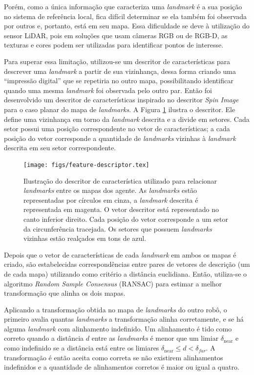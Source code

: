 Porém, como a única informação que caracteriza uma \textit{landmark} é a 
sua posição no sistema de referência local, fica difícil determinar se 
ela também foi observada por outros e, portanto, está em seu mapa. Essa 
dificuldade se deve à utilização do sensor LiDAR, pois em soluções que usam 
câmeras RGB ou de RGB-D, as texturas e cores podem ser utilizadas para 
identificar pontos de interesse.

Para superar essa limitação, utilizou-se um descritor de características 
para descrever uma \textit{landmark} a partir de sua vizinhança, dessa 
forma criando uma ``impressão digital'' que se repetiria no outro mapa, 
possibilitando identificar quando uma mesma \textit{landmark} foi observada 
pelo outro par. Então foi desenvolvido um descritor de características 
inspirado no descritor \textit{Spin Image} \cite{johnson1999using} 
para o caso planar do mapa de \textit{landmarks}. A Figura \ref{fig:feature-descriptor} ilustra o descritor. Ele define uma 
vizinhança em torno da \textit{landmark} descrita e a divide em setores. 
Cada setor possui uma posição correspondente no vetor de características; 
a cada posição do vetor corresponde a quantidade de \textit{landmarks} 
vizinhas à \textit{landmark} descrita em seu setor correspondente.

\begin{figure}[h]
  \centering
  \texttt{[image: figs/feature-descriptor.tex]}
  \caption[Descritor de características utilizado no registro de nuvem de pontos]{Ilustração do descritor de característica utilizado para 
  relacionar \textit{landmarks} entre os mapas dos agente. As \textit{landmarks} estão representadas por círculos em cinza, a \textit{landmark} descrita é representada em magenta. O vetor descritor está representado no canto inferior direito. Cada posição do vetor corresponde a um setor da circunferência tracejada. Os setores que 
  possuem \textit{landmarks} vizinhas estão realçados em tons de azul.}
  \label{fig:feature-descriptor}
\end{figure}

Depois que o vetor de características de cada \textit{landmark} em ambos os 
mapas é criado, são estabelecidas correspondências entre pares de vetores de descrição (um de cada mapa) utilizando 
como critério a distância euclidiana. 
Então, utiliza-se o algoritmo \textit{Random Sample Consensus} (RANSAC) 
\cite{fischler1981random} para estimar a melhor transformação que alinha 
os dois mapas.

Aplicando a transformação obtida no mapa de \textit{landmarks} do outro 
robô, o primeiro avalia quantas \textit{landmarks} a transformação alinha 
corretamente, e se há alguma \textit{landmark} com alinhamento indefinido. 
Um alinhamento é tido como correto quando a distância $d$ entre as 
\textit{landmarks} é menor que um limiar $\delta_{\text{near}}$ e como 
indefinido se a distância está entre os limiares 
$\delta_{\text{near}} \leq d < \delta_{far}$. A transformação é então aceita 
como correta se não existirem alinhamentos indefinidos e a quantidade de 
alinhamentos corretos é maior ou igual a quatro.

